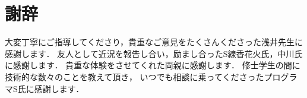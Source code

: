 \chapter*{謝辞}

大変丁寧にご指導してくださり，貴重なご意見をたくさんくださった浅井先生に感謝します．
友人として近況を報告し合い，励まし合ったS線香花火氏，中川氏に感謝します．
貴重な体験をさせてくれた両親に感謝します．
修士学生の間に技術的な数々のことを教えて頂き，
いつでも相談に乗ってくださったプログラマS氏に感謝します．
